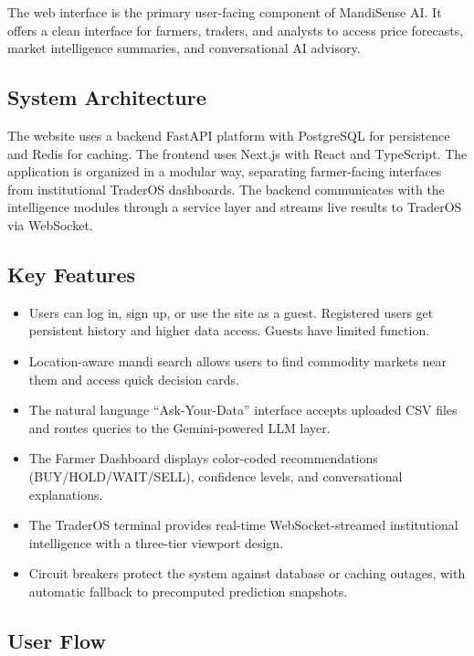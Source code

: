 \documentclass[12pt,a4paper]{report}
\theoremstyle{definition}
\theoremstyle{remark}
\begin{document}
The web interface is the primary user-facing component of MandiSense AI. It offers a clean interface for farmers, traders, and analysts to access price forecasts, market intelligence summaries, and conversational AI advisory.

\subsection{System Architecture}

The website uses a backend FastAPI platform with PostgreSQL for persistence and Redis for caching. The frontend uses Next.js with React and TypeScript. The application is organized in a modular way, separating farmer-facing interfaces from institutional TraderOS dashboards. The backend communicates with the intelligence modules through a service layer and streams live results to TraderOS via WebSocket.

\subsection{Key Features}

\begin{itemize}
    \item Users can log in, sign up, or use the site as a guest. Registered users get persistent history and higher data access. Guests have limited function.
    \item Location-aware mandi search allows users to find commodity markets near them and access quick decision cards.
    \item The natural language ``Ask-Your-Data'' interface accepts uploaded CSV files and routes queries to the Gemini-powered LLM layer.
    \item The Farmer Dashboard displays color-coded recommendations (BUY/HOLD/WAIT/SELL), confidence levels, and conversational explanations.
    \item The TraderOS terminal provides real-time WebSocket-streamed institutional intelligence with a three-tier viewport design.
    \item Circuit breakers protect the system against database or caching outages, with automatic fallback to precomputed prediction snapshots.
\end{itemize}

\subsection{User Flow}
\end{document}
